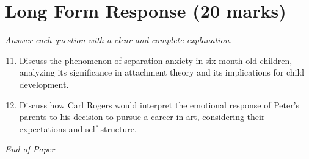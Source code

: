 \documentclass[12pt]{article}
\begin{document}
\section*{Long Form Response (20 marks)}
\textit{Answer each question with a clear and complete explanation.}
\begin{enumerate}[label=\arabic*.]
\setcounter{enumi}{10}
\item Discuss the phenomenon of separation anxiety in six-month-old children, analyzing its significance in attachment theory and its implications for child development.
\item Discuss how Carl Rogers would interpret the emotional response of Peter's parents to his decision to pursue a career in art, considering their expectations and self-structure.
\end{enumerate}

\vfill
\noindent\textit{End of Paper}
\end{document}
